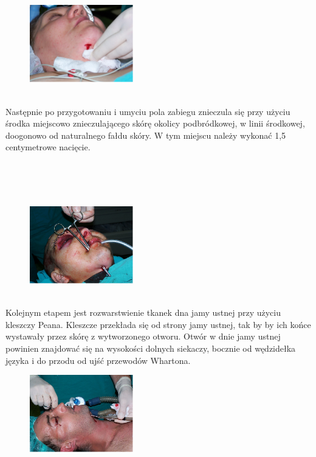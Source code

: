 \documentclass[a4paper, 12pt]{report}
\begin{document}
\begin{figure}
\includegraphics[width=0.4\textwidth]{images/itp2}
\end{figure}

\hfill\\
Następnie po przygotowaniu i umyciu pola zabiegu znieczula się przy
użyciu środka miejscowo znieczulającego skórę okolicy podbródkowej, w
linii środkowej, doogonowo od naturalnego fałdu skóry.  W tym miejscu
należy wykonać 1,5 centymetrowe nacięcie.

\newpage
\hfill\\
\hfill\\
\hfill\\

\begin{figure}
\includegraphics[width=0.4\textwidth]{images/itp3}
\end{figure}

\hfill\\
Kolejnym etapem jest rozwarstwienie tkanek dna jamy ustnej przy użyciu
kleszczy Peana. Kleszcze przekłada się od strony jamy ustnej, tak by
by ich końce wystawały przez skórę z wytworzonego otworu. Otwór w
dnie jamy ustnej powinien znajdować się na wysokości dolnych siekaczy,
bocznie od wędzidełka języka i do przodu od ujść przewodów Whartona.
\hfill\\

\begin{figure}
\includegraphics[width=0.4\textwidth]{images/itp3a}
\end{figure}
\end{document}
